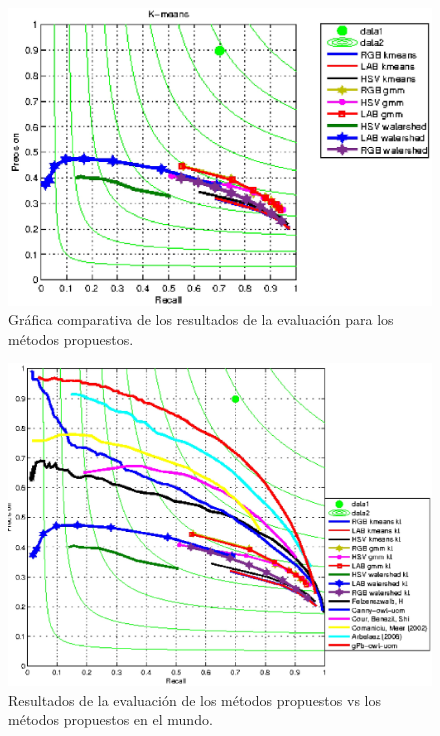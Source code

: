 \documentclass[10pt,twocolumn,letterpaper]{article}
\begin{document}
\begin{figure}[ht]
\begin{center}
   \includegraphics[scale=0.55]{completas.eps}
\end{center}
   \caption{Gráfica comparativa de los resultados de la evaluación para los métodos propuestos. }
\label{fig:long}
\label{fig:onecol}
\end{figure}

\begin{figure}[ht]
\begin{center}
   \includegraphics[scale=0.42]{compara1.eps}
\end{center}
   \caption{Resultados de la evaluación de los métodos propuestos vs los métodos propuestos en el mundo. }
\label{fig:long}
\label{fig:onecol}
\end{figure}
\end{document}
